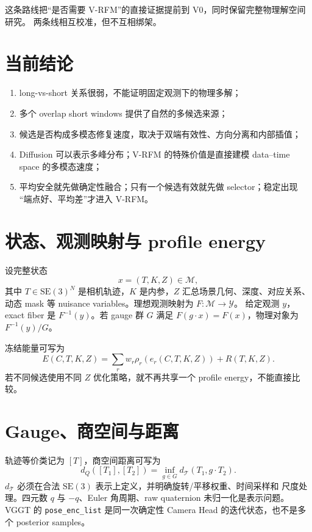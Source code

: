 \documentclass[UTF8,a4paper,11pt]{ctexart}
\newcommand{\SE}{\mathrm{SE}}
\newcommand{\Mspace}{\mathcal M}
\begin{document}
这条路线把“是否需要 V-RFM”的直接证据提前到 V0，同时保留完整物理解空间研究。
两条线相互校准，但不互相绑架。

\section{当前结论}

\begin{enumerate}
  \item long-vs-short 关系很弱，不能证明固定观测下的物理多解；
  \item 多个 overlap short windows 提供了自然的多候选来源；
  \item 候选是否构成多模态修复速度，取决于双端有效性、方向分离和内部插值；
  \item Diffusion 可以表示多峰分布；V-RFM 的特殊价值是直接建模 data--time space
    的多模态速度；
  \item 平均安全就先做确定性融合；只有一个候选有效就先做 selector；稳定出现
    “端点好、平均差”才进入 V-RFM。
\end{enumerate}

\appendix

\section{状态、观测映射与 profile energy}

设完整状态
\begin{equation}
  x=(T,K,Z)\in\Mspace,
\end{equation}
其中 $T\in\SE(3)^N$ 是相机轨迹，$K$ 是内参，$Z$ 汇总场景几何、深度、对应关系、
动态 mask 等 nuisance variables。理想观测映射为 $F:\Mspace\to\mathcal Y$。
给定观测 $y$，exact fiber 是 $F^{-1}(y)$。若 gauge 群 $G$ 满足
$F(g\cdot x)=F(x)$，物理对象为 $F^{-1}(y)/G$。

冻结能量可写为
\begin{equation}
  E(C,T,K,Z)=\sum_r w_r\rho_r\!\left(e_r(C,T,K,Z)\right)+R(T,K,Z).
\end{equation}
若不同候选使用不同 $Z$ 优化策略，就不再共享一个 profile energy，不能直接比较。

\section{Gauge、商空间与距离}

轨迹等价类记为 $[T]$，商空间距离可写为
\begin{equation}
  d_Q([T_1],[T_2])=\inf_{g\in G}d_{\mathcal T}(T_1,g\cdot T_2).
\end{equation}
$d_{\mathcal T}$ 必须在合法 $\SE(3)$ 表示上定义，并明确旋转/平移权重、时间采样和
尺度处理。四元数 $q$ 与 $-q$、Euler 角周期、raw quaternion 未归一化是表示问题。
VGGT 的 \texttt{pose\_enc\_list} 是同一次确定性 Camera Head 的迭代状态，也不是多个
posterior samples\citep{wang2025vggt}。
\end{document}
